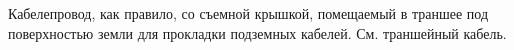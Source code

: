 Кабелепровод, как правило, со съемной крышкой, помещаемый в
траншее под поверхностью земли для прокладки подземных кабелей.
См. траншейный кабель.